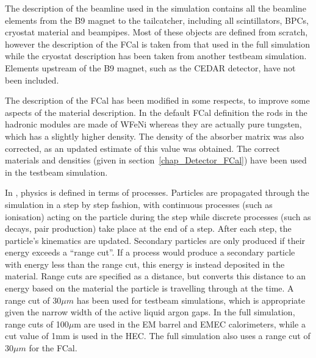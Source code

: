 The description of the beamline used in the simulation contains all the beamline elements from the B9 magnet to the tailcatcher, including all scintillators, BPCs, cryostat material and beampipes. Most of these objects are defined from scratch, however the description of the FCal is taken from that used in the full \atlas simulation while the cryostat description has been taken from another testbeam simulation. Elements upstream of the B9 magnet, such as the CEDAR detector, have not been included. 

The description of the FCal has been modified in some respects, to improve some aspects of the material description. In the default FCal definition the rods in the hadronic modules are made of WFeNi whereas they are actually pure tungsten, which has a slightly higher density. The density of the absorber matrix was also corrected, as an updated estimate of this value was obtained. The correct materials and densities (given in section~\ref{chap_Detector_FCal}) have been used in the testbeam simulation.



In \geant, physics is defined in terms of processes. Particles are propagated through the simulation in a step by step fashion, with continuous processes (such as ionisation) acting on the particle during the step while discrete processes (such as decays, pair production) take place at the end of a step. After each step, the particle's kinematics are updated. Secondary particles are only produced if their energy exceeds a ``range cut''. If a process would produce a secondary particle with energy less than the range cut, this energy is instead deposited in the material. Range cuts are specified as a distance, but \geant converts this distance to an energy based on the material the particle is travelling through at the time. A range cut of $30 \mu m$ has been used for testbeam simulations, which is appropriate given the narrow width of the active liquid argon gaps. In the full \atlas simulation, range cuts of 100$\mu$m are used in the EM barrel and EMEC calorimeters, while a cut value of 1mm is used in the HEC. The full \atlas simulation also uses a range cut of $30 \mu m$ for the FCal.

